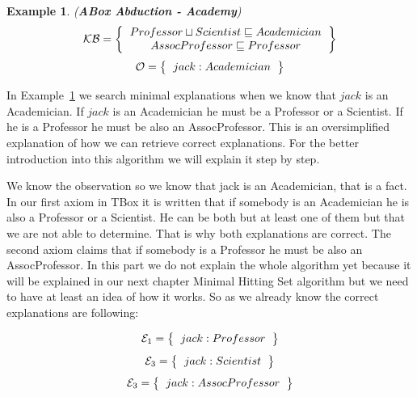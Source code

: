 \documentclass[12pt,a4paper]{article}
\newtheorem{example}{Example}[subsection]
\begin{document}
\begin{example}{(\textbf{ABox Abduction - Academy})}
	\label{example:abductionAcademy}
	\[ 
	\mathcal{KB} = \left\{
	\begin{tabular}{c c}
		$Professor \sqcup Scientist \sqsubseteq Academician$ \\
		$AssocProfessor \sqsubseteq Professor$ \\
	\end{tabular}
	\right \}
	\]
	\[ 
	\mathcal{O} = \left\{
	\begin{tabular}{c c}
		$jack : Academician$
	\end{tabular}
	\right \}
	\]								
\end{example}

In Example~\ref{example:abductionAcademy} we search minimal explanations when we know that $jack$ is an Academician. If $jack$ is an Academician he must be a Professor or a Scientist. If he is a Professor he must be also an AssocProfessor. This is an oversimplified explanation of how we can retrieve correct explanations. For the better introduction into this algorithm we will explain it step by step. 

We know the observation so we know that jack is an Academician, that is a fact. In our first axiom in TBox it is written that if somebody is an Academician he is also a Professor or a Scientist. He can be both but at least one of them but that we are not able to determine. That is why both explanations are correct. The second axiom claims that if somebody is a Professor he must be also an AssocProfessor. In this part we do not explain the whole algorithm yet because it will be explained in our next chapter Minimal Hitting Set algorithm but we need to have at least an idea of how it works. So as we already know the correct explanations are following:

\[ 
\mathcal{E}_{1} = \left\{
\begin{tabular}{c c}
	$jack : Professor$ \\
\end{tabular}
\right \}
\]
\[ 
\mathcal{E}_{3} = \left\{
\begin{tabular}{c c}
	$jack : Scientist$ \\
\end{tabular}
\right \}
\]
\[ 
\mathcal{E}_{3} = \left\{
\begin{tabular}{c c}
	$jack : AssocProfessor$ \\
\end{tabular}
\right \}
\]
\end{document}

